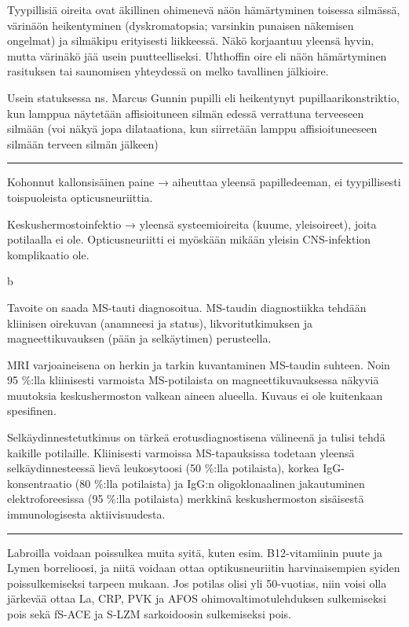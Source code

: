 \documentclass[
]{book}
\begin{document}
Tyypillisiä oireita ovat äkillinen ohimenevä näön hämärtyminen toisessa silmässä, värinäön heikentyminen (dyskromatopsia; varsinkin punaisen näkemisen ongelmat) ja silmäkipu erityisesti liikkeessä. Näkö korjaantuu yleensä hyvin, mutta värinäkö jää usein puutteelliseksi. Uhthoffin oire eli näön hämärtyminen rasituksen tai saunomisen yhteydessä on melko tavallinen jälkioire.

Usein statuksessa ns. Marcus Gunnin pupilli eli heikentynyt pupillaarikonstriktio, kun lamppua näytetään affisioituneen silmän edessä verrattuna terveeseen silmään (voi näkyä jopa dilataationa, kun siirretään lamppu affisioituneeseen silmään terveen silmän jälkeen)

\begin{center}\rule{0.5\linewidth}{0.5pt}\end{center}

Kohonnut kallonsisäinen paine → aiheuttaa yleensä papilledeeman, ei tyypillisesti toispuoleista opticusneuriittia.

Keskushermostoinfektio → yleensä systeemioireita (kuume, yleisoireet), joita potilaalla ei ole. Opticusneuriitti ei myöskään mikään yleisin CNS-infektion komplikaatio ole.

b

Tavoite on saada MS-tauti diagnosoitua. MS-taudin diagnostiikka tehdään kliinisen oirekuvan (anamneesi ja status), likvoritutkimuksen ja magneettikuvauksen (pään ja selkäytimen) perusteella.

MRI varjoaineisena on herkin ja tarkin kuvantaminen MS-taudin suhteen. Noin 95 \%:lla kliinisesti varmoista MS-potilaista on magneettikuvauksessa näkyviä muutoksia keskushermoston valkean aineen alueella. Kuvaus ei ole kuitenkaan spesifinen.

Selkäydinnestetutkimus on tärkeä erotusdiagnostisena välineenä ja tulisi tehdä kaikille potilaille. Kliinisesti varmoissa MS-tapauksissa todetaan yleensä selkäydinnesteessä lievä leukosytoosi (50 \%:lla potilaista), korkea IgG-konsentraatio (80 \%:lla potilaista) ja IgG:n oligoklonaalinen jakautuminen elektroforeesissa (95 \%:lla potilaista) merkkinä keskushermoston sisäisestä immunologisesta aktiivisuudesta.

\begin{center}\rule{0.5\linewidth}{0.5pt}\end{center}

Labroilla voidaan poissulkea muita syitä, kuten esim. B12-vitamiinin puute ja Lymen borrelioosi, ja niitä voidaan ottaa optikusneuriitin harvinaisempien syiden poissulkemiseksi tarpeen mukaan. Jos potilas olisi yli 50-vuotias, niin voisi olla järkevää ottaa La, CRP, PVK ja AFOS ohimovaltimotulehduksen sulkemiseksi pois sekä fS-ACE ja S-LZM sarkoidoosin sulkemiseksi pois.
\end{document}
